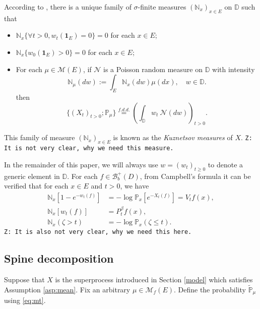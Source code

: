 \documentclass[12pt,a4paper]{amsart}
\numberwithin{equation}{section}
\theoremstyle{plain}
\theoremstyle{definition}
\theoremstyle{remark}
\begin{document}
	According to \cite[Section 8.4]{Li2011Measure-valued}, there is a unique family of $\sigma$-finite measures $(\mathbb N_x)_{x\in E}$ on $\mathbb D$ such that
\begin{itemize}
\item
    $\mathbb N_x \{\forall t > 0, w_t(\mathbf 1_E)=0\} =0$ for each $x\in E$;
\item
    $\mathbb N_x \{ w_0(\mathbf 1_E) > 0\} = 0$ for each $x\in E$;
\item
    For each $\mu \in \mathcal M(E)$, if $\mathcal N$ is a Poisson random measure on $\mathbb D$ with intensity
\[
	\mathbb N_\mu(dw):= \int_E \mathbb N_x(dw)\mu(dx), \quad w\in \mathbb D.
\]
	then
\[
	\{(X_t)_{t> 0};\mathbb P_\mu\}
	\overset{f.d.d.}{=} \left(\int_{\mathbb D} w_t~\mathcal N(dw)\right)_{t> 0}.
\]
\end{itemize}
	This family of measure $(\mathbb N_x)_{x\in E}$ is known as the \emph{Kuznetsov measures} of $X$.
	{\tt Z: It is not very clear, why we need this measure.}

	In the remainder of this paper, we will always use $w = (w_t)_{t\geq 0}$ to denote a generic element in $\mathbb D$.
	For each $f\in \mathcal B_b^+(D)$, from Campbell's formula it can be verified that for each $x\in E$ and $t>0$, we have
\begin{align}\label{eq: kuznetsov Laplace}
 	\mathbb N_x[1-e^{-w_t(f) }]
 	&=-\log \mathbb P_x[e^{-X_t(f)}] = V_t f(x),
 	\\ \mathbb N_x[w_t(f)]
 	&=P_t^{\beta}f(x),
 	\\
 \mathbb N_x(\zeta > t) &= - \log \mathbb P_x(\zeta \leq t).
\end{align}
	{\tt Z: It is also not very clear, why we need this here.}


\subsection{Spine decomposition}
    Suppose that $X$ is the superprocess introduced in Section \ref{model} which satisfies Assumption \ref{asp:mean}.   Fix an arbitrary $\mu\in \mathcal M_f(E)$.  Define the probability $\widetilde {\mathbb P}_\mu$ using \eqref{eq:mt}.
\end{document}
